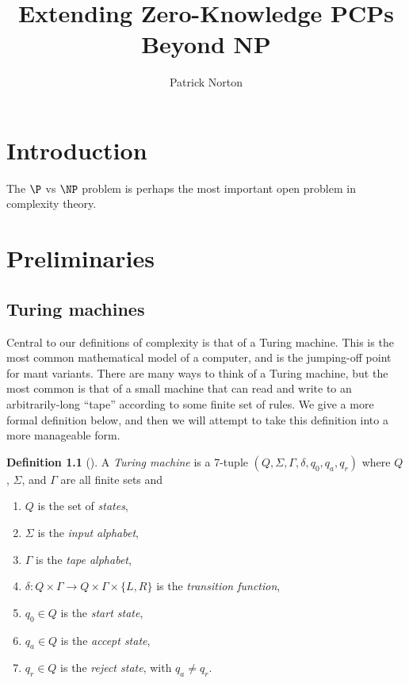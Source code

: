 \documentclass[english]{reedthesis}
\title{Extending Zero-Knowledge PCPs Beyond NP}
\author{Patrick Norton}
\theoremstyle{plain}
\theoremstyle{definition}
\newtheorem{defn}[defn]{Definition}
\theoremstyle{remark}
\begin{document}
\maketitle

\tableofcontents

\listofalgorithms


\chapter*{Introduction}

The $\P$ vs $\NP$ problem is perhaps the most important open problem in
complexity theory.

\chapter{Preliminaries}


\section{Turing machines}


Central to our definitions of complexity is that of a Turing machine. This is
the most common mathematical model of a computer, and is the jumping-off point
for mant variants. There are many ways to think of a Turing machine, but the
most common is that of a small machine that can read and write to an
arbitrarily-long ``tape'' according to some finite set of rules. We give a more
formal definition below, and then we will attempt to take this definition into a
more manageable form.
\begin{defn}[{\cite[Def.\ 3.1]{Sip97}}]\label{def:TM}
  A \emph{Turing machine} is a 7-tuple $(Q, \Sigma, \Gamma, \delta, q_{0}, q_{a}, q_{r})$ where
  $Q$, $\Sigma$, and $\Gamma$ are all finite sets and
  \begin{enumerate}
    \item $Q$ is the set of \emph{states},
    \item $\Sigma$ is the \emph{input alphabet},
    \item $\Gamma$ is the \emph{tape alphabet},
    \item $\delta: Q \times \Gamma \rightarrow Q \times \Gamma \times \{L, R\}$ is the \emph{transition function},
    \item $q_{0} \in Q$ is the \emph{start state},
    \item $q_{a} \in Q$ is the \emph{accept state},
    \item $q_{r} \in Q$ is the \emph{reject state}, with $q_{a} \ne q_{r}$.
  \end{enumerate}
\end{defn}
\end{document}
